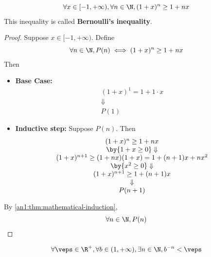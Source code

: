 \begin{lemma} \label{an1:lem:bernoullis-inequality}
  \[
    \forall x \in [-1, + \infty), \forall n \in \N, (1 + x)^{n} \geq 1 + nx
  \]
  This inequality is called \textbf{Bernoulli's inequality}.
\end{lemma}

\begin{proof}
  Suppose $x \in [-1, + \infty)$. Define
  \[
    \forall n \in \N, P(n) \iff (1 + x)^{n} \geq 1 + nx
  \]
  Then
  \begin{itemize}
    \item \textbf{Base Case:}
          \[
            \begin{array}{c}
              (1 + x)^{1} = 1 + 1 \cdot x \\
              \Downarrow                  \\
              P(1)
            \end{array}
          \]
    \item \textbf{Inductive step:} Suppose $P(n)$. Then
          \[
            \begin{array}{c}
              (1 + x)^{n} \geq 1 + nx                                      \\
              \by{\ensuremath{1 + x \geq 0}} \Downarrow                    \\
              (1 + x)^{n + 1} \geq (1 + nx)(1 + x) = 1 + (n + 1)x + nx^{2} \\
              \by{\ensuremath{x^{2} \geq 0}} \Downarrow                    \\
              (1 + x)^{n + 1} \geq 1 + (n + 1)x                            \\
              \Downarrow                                                   \\
              P(n + 1)
            \end{array}
          \]
  \end{itemize}
  By \cref{an1:thm:mathematical-induction},
  \[
    \forall n \in \N, P(n)
  \]
\end{proof}

\begin{theorem} \label{an1:thm:archimedean-property-corollary}
  \[
    \forall \veps \in \R^{+}, \forall b \in (1, + \infty), \exists n \in \N, b^{-n} < \veps
  \]
\end{theorem}

